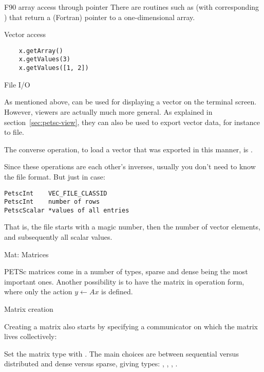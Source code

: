 \begin{fortrannote}{F90 array access through pointer}
  There are routines such as 
  (with corresponding )
  that
  return a (Fortran) pointer to a one-dimensional array.
\end{fortrannote}

\begin{pythonnote}{Vector access}
  \begin{lstlisting}
    x.getArray()
    x.getValues(3)
    x.getValues([1, 2])
  \end{lstlisting}
\end{pythonnote}

 {File I/O}
\label{sec:vecviewload}

As mentioned above,  can be used for
displaying a vector on the terminal screen.
However, viewers are actually much more general.
As explained in section~\ref{sec:petsc-view},
they can also be used to export vector data, for instance to file.

The converse operation, to load a vector that was exported in this manner,
is .

Since these operations are each other's inverses,
usually you don't need to know the file format.
But just in case:
\begin{lstlisting}
PetscInt    VEC_FILE_CLASSID
PetscInt    number of rows
PetscScalar *values of all entries
\end{lstlisting}
That is, the file starts with a magic number, then the number of vector elements,
and subsequently all scalar values.

 {Mat: Matrices}

PETSc matrices come in a number of types, sparse and dense being the
most important ones. Another possibility is to have the matrix in
operation form, where only the action $y\leftarrow Ax$ is defined.

 {Matrix creation}
\label{sec:petscmat-create}

Creating a matrix also starts by specifying a communicator on which
the matrix lives collectively:
%

Set the matrix type with .  The main choices
are between sequential versus distributed and dense versus sparse,
giving types: , ,
, .

